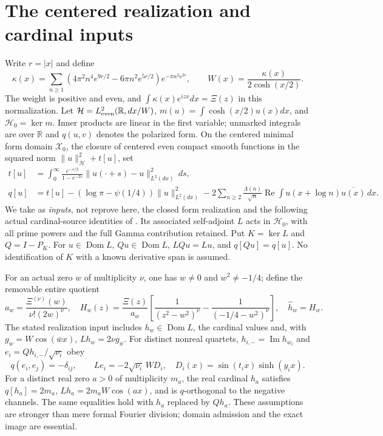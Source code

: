 \documentclass[11pt,a4paper]{article}
\newcommand{\R}{\mathbb R}\newcommand{\C}{\mathbb C}\newcommand{\norm}[1]{\lVert#1\rVert}\newcommand{\dom}{\operatorname{Dom}}
\begin{document}
\section{The centered realization and cardinal inputs}\label{sec:setup}
Write $r=|x|$ and define
\[
 \kappa(x)=\sum_{n\ge1}(4\pi^2n^4e^{9r/2}-6\pi n^2e^{5r/2})e^{-\pi n^2e^{2r}},\qquad W(x)=\frac{\kappa(x)}{2\cosh(x/2)}.
\]
The weight is positive and even, and $\int\kappa(x)e^{izx}dx=\Xi(z)$ in this normalization. Let $\mathcal H=L^2_{\rm even}(\R,dx/W)$, $m(u)=\int\cosh(x/2)u(x)dx$, and $\mathcal H_0=\ker m$. Inner products are linear in the first variable; unmarked integrals are over $\R$ and $q(u,v)$ denotes the polarized form. On the centered minimal form domain $\mathcal X_0$, the closure of centered even compact smooth functions in the squared norm $\|u\|_{\mathcal H}^2+t[u]$, set
\begin{align*}
 t[u]&=\int_0^\infty\frac{e^{-s/2}}{1-e^{-2s}}\|u(\cdot+s)-u\|_{L^2(dx)}^2\,ds,\\
 q[u]&=t[u]-(\log\pi-\psi(1/4))\|u\|_{L^2(dx)}^2
 -2\sum_{n\ge2}\frac{\Lambda(n)}{\sqrt n}\operatorname{Re}\int u(x+\log n)\overline{u(x)}\,dx.
\end{align*}
We take as \emph{inputs}, not reprove here, the closed form realization and the following actual cardinal-source identities of \cite{cardinal}. Its associated self-adjoint $L$ acts in $\mathcal H_0$, with all prime powers and the full Gamma contribution retained. Put $K=\ker L$ and $Q=I-P_K$. For $u\in\dom L$, $Qu\in\dom L$, $LQu=Lu$, and $q[Qu]=q[u]$. No identification of $K$ with a known derivative span is assumed.

For an actual zero $w$ of multiplicity $\nu$, one has $w\ne0$ and $w^2\ne-1/4$; define the removable entire quotient
\[
 a_w=\frac{\Xi^{(\nu)}(w)}{\nu!(2w)^\nu},\quad H_w(z)=\frac{\Xi(z)}{a_w}\left[\frac1{(z^2-w^2)^\nu}-\frac1{(-1/4-w^2)^\nu}\right],\quad \widehat h_w=H_w.
\]
The stated realization input includes $h_w\in\dom L$, the cardinal values and, with $g_w=W\cos(\bar w x)$, $Lh_w=2\nu g_{\bar w}$. For distinct nonreal quartets, $h_{i,-}=\operatorname{Im}h_{w_i}$ and $e_i=Qh_{i,-}/\sqrt{\nu_i}$ obey
\begin{equation}\label{eq:source}
 q(e_i,e_j)=-\delta_{ij},\qquad Le_i=-2\sqrt{\nu_i}\,W D_i,\quad D_i(x)=\sin(t_i x)\sinh(y_i x).
\end{equation}
For a distinct real zero $a>0$ of multiplicity $m_a$, the real cardinal $h_a$ satisfies $q[h_a]=2m_a$, $Lh_a=2m_aW\cos(ax)$, and is $q$-orthogonal to the negative channels. The same equalities hold with $h_a$ replaced by $Qh_a$. These assumptions are stronger than mere formal Fourier division; domain admission and the exact image are essential.
\end{document}
